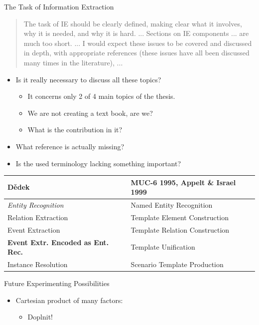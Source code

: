 \documentclass[xcolor=dvipsnames]{beamer}
\begin{document}
\begin{frame}{The Task of Information Extraction}

\begin{quotation}
\small The task of IE should be clearly defined, making clear what it involves, why it is needed, and why it is hard. ... Sections on IE components ... are much too short. ... I would expect these issues to be covered and discussed in depth, with appropriate references (these issues have all been discussed many times in the literature), ...
\end{quotation}

\begin{itemize}
	\item Is it really necessary to discuss all these topics?	
	\begin{itemize}
		\item It concerns only 2 of 4 main topics of the thesis.
		\item We are not creating a text book, are we?
		\item What is the contribution in it?
	\end{itemize}	
	\item What reference is actually missing?
	\item Is the used terminology lacking something important?
\end{itemize}
\begin{center}
	\begin{tabular}{l|l}
		Dědek & MUC-6 1995, Appelt \& Israel 1999\\
		\hline
		\emph{Entity Recognition} & Named Entity Recognition\\
		Relation Extraction & Template Element Construction\\
		Event Extraction & Template Relation Construction	\\
		\textbf{Event Extr. Encoded as Ent. Rec.} & Template Unification\\
		Instance Resolution & Scenario Template Production
	\end{tabular}
\end{center}
\end{frame}


\begin{frame}{Future Experimenting Possibilities}
\label{future_experiments}

\begin{itemize}
	\item Cartesian product of many factors:
	\begin{itemize}
		\item Doplnit!
	\end{itemize}
\end{itemize}

\end{frame}
\end{document}
